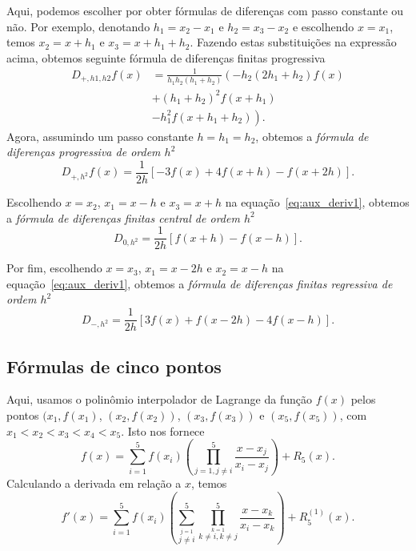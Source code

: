 Aqui, podemos escolher por obter fórmulas de diferenças com passo constante ou não. Por exemplo, denotando $h_1=x_2-x_1$ e $h_2=x_3-x_2$ e escolhendo $x=x_1$, temos $x_2 = x+h_1$ e $x_3 = x+h_1+h_2$. Fazendo estas substituições na expressão acima, obtemos seguinte fórmula de diferenças finitas progressiva
\begin{align}
  D_{+,h1,h2}f(x) &= \frac{1}{h_{1} h_{2} \left(h_{1} + h_{2}\right)} \left(- h_{2} \left(2 h_{1} + h_{2}\right) f{\left (x \right )} \right.\\
    &+ \left. \left(h_{1} + h_{2}\right)^{2} f{\left (x + h_{1} \right )} \right.\\
    &- \left. h_{1}^{2} f{\left (x + h_{1} + h_{2} \right )} \right).
\end{align}
Agora, assumindo um passo constante $h=h_1=h_2$, obtemos a \emph{fórmula de diferenças progressiva de ordem $h^2$}
\begin{equation}
  D_{+,h^2}f(x) = \frac{1}{2 h} \left[- 3 f{\left (x \right )} + 4 f{\left (x + h \right )} - f{\left (x + 2 h \right )}\right].
\end{equation}

Escolhendo $x=x_2$, $x_1=x-h$ e $x_3=x+h$ na equação~\eqref{eq:aux_deriv1}, obtemos a \emph{fórmula de diferenças finitas central de ordem $h^2$}
\begin{equation}
  D_{0,h^2} = \frac{1}{2 h} \left[f{\left (x + h \right )} - f{\left (x - h \right )}\right].
\end{equation}

Por fim, escolhendo $x=x_3$, $x_1=x-2h$ e $x_2=x-h$ na equação~\eqref{eq:aux_deriv1}, obtemos a \emph{fórmula de diferenças finitas regressiva de ordem $h^2$}
\begin{equation}
  D_{-,h^2} = \frac{1}{2 h} \left[3 f{\left (x \right )} + f{\left (x - 2 h\right )} - 4 f{\left (x - h \right )}\right].
\end{equation}

\subsection{Fórmulas de cinco pontos}

Aqui, usamos o polinômio interpolador de Lagrange da função $f(x)$ pelos pontos $(x_1, f(x_1)$, $(x_2, f(x_2))$, $(x_3, f(x_3))$ e $(x_5, f(x_5))$, com $x_1 < x_2 < x_3 < x_4 < x_5$. Isto nos fornece
\begin{equation}
  f(x) = \sum_{i=1}^5 f(x_i)\left(\prod_{j=1, j\neq i}^{5} \frac{x-x_j}{x_i-x_j}\right) + R_5(x).
\end{equation}
Calculando a derivada em relação a $x$, temos
\begin{equation}\label{eq:aux_deriv2}
  f'(x) = \sum_{i=1}^5 f(x_i)\left(\sum_{\overset{j=1}{j\neq i}}^5\prod_{\overset{k=1}{k\neq i, k\neq j}}^{5} \frac{x-x_k}{x_i-x_k}\right) + R^{(1)}_5(x).
\end{equation}

